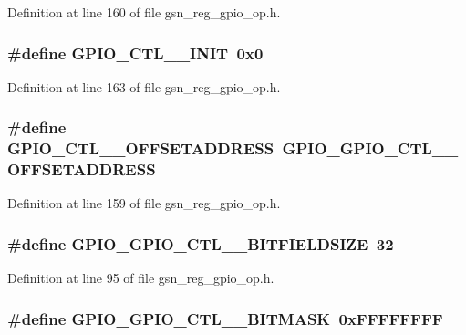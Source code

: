 Definition at line 160 of file gsn\_\-reg\_\-gpio\_\-op.h.

\hypertarget{a00553_a981704258561a20df965327d225871f8}{
\subsubsection[{GPIO\_\-CTL\_\-1\_\-INIT}]{\setlength{\rightskip}{0pt plus 5cm}\#define GPIO\_\-CTL\_\_\-INIT~0x0}}
\label{a00553_a981704258561a20df965327d225871f8}


Definition at line 163 of file gsn\_\-reg\_\-gpio\_\-op.h.

\hypertarget{a00553_a3f785a80b762b43c1d9041f53e1961fa}{
\subsubsection[{GPIO\_\-CTL\_\-1\_\-OFFSETADDRESS}]{\setlength{\rightskip}{0pt plus 5cm}\#define GPIO\_\-CTL\_\_\-OFFSETADDRESS~GPIO\_\-GPIO\_\-CTL\_\_\-OFFSETADDRESS}}
\label{a00553_a3f785a80b762b43c1d9041f53e1961fa}


Definition at line 159 of file gsn\_\-reg\_\-gpio\_\-op.h.

\hypertarget{a00553_acb2d33fc9e30401f0003f0d6a2ed5814}{
\subsubsection[{GPIO\_\-GPIO\_\-CTL\_\-0\_\-BITFIELDSIZE}]{\setlength{\rightskip}{0pt plus 5cm}\#define GPIO\_\-GPIO\_\-CTL\_\_\-BITFIELDSIZE~32}}
\label{a00553_acb2d33fc9e30401f0003f0d6a2ed5814}


Definition at line 95 of file gsn\_\-reg\_\-gpio\_\-op.h.

\hypertarget{a00553_abe490f433f4a906c6c8f6ac560ba9e01}{
\subsubsection[{GPIO\_\-GPIO\_\-CTL\_\-0\_\-BITMASK}]{\setlength{\rightskip}{0pt plus 5cm}\#define GPIO\_\-GPIO\_\-CTL\_\_\-BITMASK~0xFFFFFFFF}}
\label{a00553_abe490f433f4a906c6c8f6ac560ba9e01}


